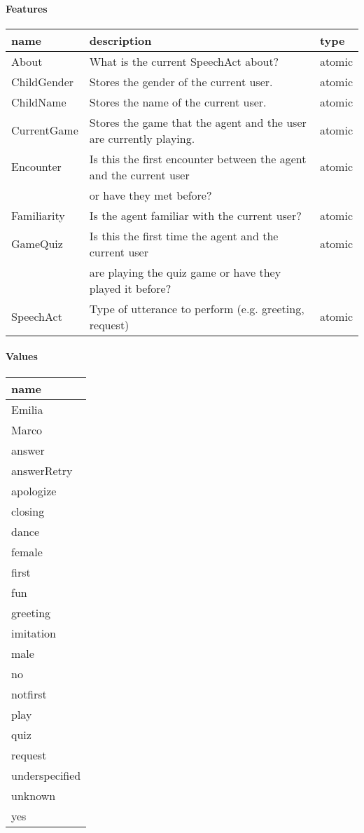 \documentclass[11pt]{article}
\begin{document}
\paragraph{Features}
\label{sec-3-4-1-1}
\begin{center}
\begin{tabular}{lll}
\hline
\textbf{name} & \textbf{description} & \textbf{type}\\
\hline
About & What is the current SpeechAct about? & atomic\\
ChildGender & Stores the gender of the current user. & atomic\\
ChildName & Stores the name of the current user. & atomic\\
CurrentGame & Stores the game that the agent and the user are currently playing. & atomic\\
Encounter & Is this the first encounter between the agent and the current user & atomic\\
 & or have they met before? & \\
Familiarity & Is the agent familiar with the current user? & atomic\\
GameQuiz & Is this the first time the agent and the current user & atomic\\
 & are playing the quiz game or have they played it before? & \\
SpeechAct & Type of utterance to perform (e.g. greeting, request) & atomic\\
\hline
\end{tabular}
\end{center}

\paragraph{Values}
\label{sec-3-4-1-2}
\begin{center}
\begin{tabular}{l}
\hline
\textbf{name}\\
\hline
Emilia\\
Marco\\
answer\\
answerRetry\\
apologize\\
closing\\
dance\\
female\\
first\\
fun\\
greeting\\
imitation\\
male\\
no\\
notfirst\\
play\\
quiz\\
request\\
underspecified\\
unknown\\
yes\\
\hline
\end{tabular}
\end{center}
\end{document}
